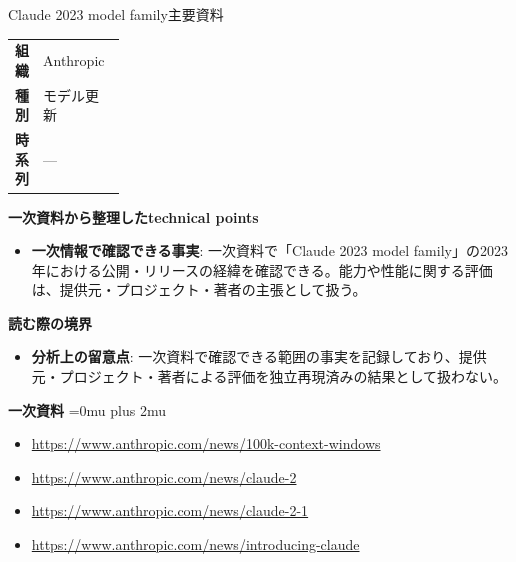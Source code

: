\begin{technicalnote}{Claude 2023 model family}{主要資料}
\begingroup
\begin{tabularx}{\linewidth}{@{}>{\bfseries}p{0.22\linewidth}X@{}}
組織 & Anthropic \\
種別 & モデル更新 \\
時系列 & — \\
\end{tabularx}
\smallskip
{\bfseries 一次資料から整理したtechnical points}
\begin{itemize}[leftmargin=1.5em,itemsep=0.35em]
\item \textbf{一次情報で確認できる事実}: 一次資料で「Claude 2023 model family」の2023年における公開・リリースの経緯を確認できる。能力や性能に関する評価は、提供元・プロジェクト・著者の主張として扱う。
\end{itemize}
\begin{minipage}{\linewidth}
{\bfseries 読む際の境界}
\begin{itemize}[leftmargin=1.5em,itemsep=0.35em]
\item \textbf{分析上の留意点}: 一次資料で確認できる範囲の事実を記録しており、提供元・プロジェクト・著者による評価を独立再現済みの結果として扱わない。
\end{itemize}
\begin{samepage}
{\bfseries 一次資料}
\begingroup\sloppy
\Urlmuskip=0mu plus 2mu\relax
\begin{itemize}[leftmargin=1.5em,itemsep=0.25em]
\item {\scriptsize\url{https://www.anthropic.com/news/100k-context-windows}}
\item {\scriptsize\url{https://www.anthropic.com/news/claude-2}}
\item {\scriptsize\url{https://www.anthropic.com/news/claude-2-1}}
\item {\scriptsize\url{https://www.anthropic.com/news/introducing-claude}}
\end{itemize}
\endgroup
\end{samepage}
\end{minipage}
\endgroup
\end{technicalnote}
\medskip

